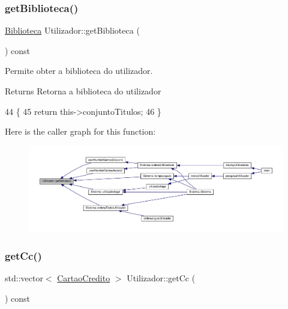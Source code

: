 \subsubsection{\texorpdfstring{get\+Biblioteca()}{getBiblioteca()}}
{\footnotesize\ttfamily \hyperlink{classBiblioteca}{Biblioteca} Utilizador\+::get\+Biblioteca (\begin{DoxyParamCaption}{ }\end{DoxyParamCaption}) const}



Permite obter a biblioteca do utilizador. 

\begin{DoxyReturn}{Returns}
Retorna a biblioteca do utilizador 
\end{DoxyReturn}

\begin{DoxyCode}
44                                            \{
45     \textcolor{keywordflow}{return} this->conjuntoTitulos;
46 \}
\end{DoxyCode}
Here is the caller graph for this function\+:
\nopagebreak
\begin{figure}[H]
\begin{center}
\leavevmode
\includegraphics[width=350pt]{classUtilizador_a6a128859b776bf019b5652ce61f62280_icgraph}
\end{center}
\end{figure}
\mbox{\label{classUtilizador_ad0ebe5ff80aa77145ec4b0ce5473102c}} 
\subsubsection{\texorpdfstring{get\+Cc()}{getCc()}}
{\footnotesize\ttfamily std\+::vector$<$ \hyperlink{classCartaoCredito}{Cartao\+Credito} $>$ Utilizador\+::get\+Cc (\begin{DoxyParamCaption}{ }\end{DoxyParamCaption}) const}



